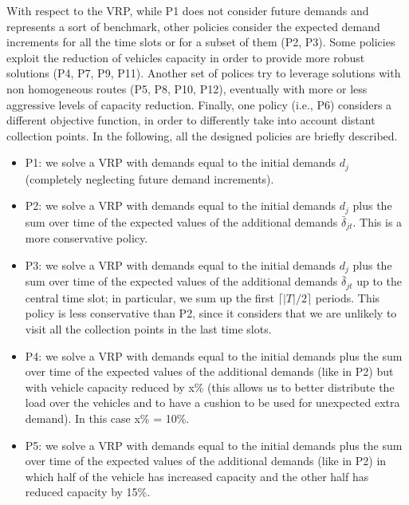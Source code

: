 \documentclass[preprint,11pt,authoryear]{elsarticle}
\begin{document}
With respect to the VRP, while P1 does not consider future demands and represents a sort of benchmark, other policies consider the expected demand increments for all the time slots or for a subset of them (P2, P3). Some policies exploit the reduction of vehicles capacity in order to provide more robust solutions (P4, P7, P9, P11). Another set of polices try to leverage solutions with non homogeneous routes (P5, P8, P10, P12), eventually with more or less aggressive levels of capacity reduction. Finally, one policy (i.e., P6) considers a different objective function, in order to differently take into account distant collection points. In the following, all the designed policies are briefly described.
\begin{itemize}
\item P1: we solve a VRP with demands equal to the initial demands $d_j$ (completely neglecting future demand increments).

\item P2: we solve a VRP with demands equal to the initial demands $d_j$ plus the  sum over time of the expected values of the additional demands $\bar\delta_{jt}$. This is a more conservative policy. 

\item P3: we solve a VRP with demands equal to the initial demands $d_j$ plus the sum over time of the expected values of the additional demands $\bar\delta_{jt}$ up to the central time slot; in particular, we sum up the first $\lceil |T| /2 \rceil$ periods. This policy is less conservative than P2, since it considers that we are unlikely to visit all the collection points in the last time slots.

\item P4: we solve a VRP with demands equal to the initial demands plus the sum over time of the expected values of the additional demands (like in P2) but with vehicle capacity reduced by x\% (this allows us to better distribute the load over the vehicles and to have a cushion to be used for unexpected extra demand). In this case x\% = 10\%. 

\item P5: we solve a VRP with demands equal to the initial demands plus the sum over time of the expected values of the additional demands (like in P2)
in which half of the vehicle has increased capacity and the other half has reduced capacity by 15\%. 


\end{itemize}
\end{document}
